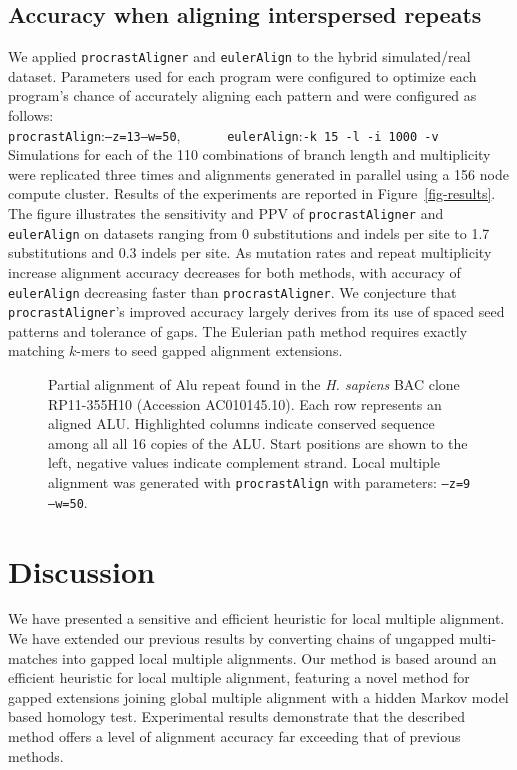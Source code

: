 \documentclass{ws-procs975x65}
\begin{document}
\subsection{Accuracy when aligning interspersed repeats}
We applied \texttt{procrastAligner} and \texttt{eulerAlign} to the
hybrid simulated/real dataset.  Parameters used for each program were
configured to optimize each program's chance of accurately aligning
each pattern and were configured as
follows:\\\texttt{procrastAlign}:\texttt{--z=13--w=50},
\ \ \ \ \ \ \texttt{eulerAlign}:\texttt{-k 15 -l -i 1000 -v} \\
Simulations for each of the 110 combinations of branch length and
multiplicity were replicated three times and alignments generated in
parallel using a 156 node compute cluster.  Results of the experiments
are reported in Figure~\ref{fig-results}. The figure illustrates the
sensitivity and PPV of \texttt{procrastAligner} and
\texttt{eulerAlign} on datasets ranging from 0 substitutions and
indels per site to 1.7 substitutions and 0.3 indels per site.  As
mutation rates and repeat multiplicity increase alignment accuracy
decreases for both methods, with accuracy of \texttt{eulerAlign}
decreasing faster than \texttt{procrastAligner}.  We conjecture that
\texttt{procrastAligner}'s improved accuracy largely derives from its
use of spaced seed patterns\cite{ref-procrast} and tolerance of gaps.
The Eulerian path method requires exactly matching $k$-mers to seed
gapped alignment extensions.
\begin{figure}[t]
\centering {}
\vspace{-1.0cm}
\caption{Partial alignment of Alu repeat found in the \emph{H. sapiens} BAC
clone RP11-355H10 (Accession AC010145.10). Each row represents an
aligned ALU. Highlighted columns indicate conserved sequence among all
all 16 copies of the ALU. Start positions are shown to the left, negative
values indicate complement strand.  Local multiple alignment was
generated with \texttt{procrastAlign} with parameters: \texttt{--z=9
--w=50}.  }
\label{fig-align}
\end{figure}

\section{Discussion}
We have presented a sensitive and efficient heuristic for local
multiple alignment. We have extended our previous results by
converting chains of ungapped multi-matches into gapped local multiple
alignments. Our method is based around an efficient heuristic for
local multiple alignment, featuring a novel method for gapped
extensions joining global multiple alignment with a hidden Markov
model based homology test.  Experimental results demonstrate that the
described method offers a level of alignment accuracy far exceeding
that of previous methods.
\end{document}
